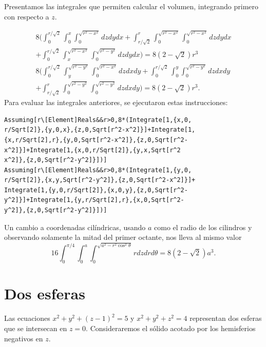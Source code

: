 Presentamos las integrales que permiten calcular el volumen, integrando primero con respecto a $z$.
%

{\small
\begin{multline*}
8\bigg( \int_{0}^{r/\sqrt{2}}\int_{0}^{x}\int_{0}^{\sqrt{r^{2}-x^{2}}}dzdydx+\int_{r/\sqrt{2}}^{r}\int_{0}^{\sqrt{r^{2}-x^{2}}}\int_{0}^{\sqrt{r^{2}-x^{2}}}dzdydx \\
+\int_{0}^{r/\sqrt{2}}\int_{x}^{\sqrt{r^{2}-x^{2}}}\int_{0}^{\sqrt{r^{2}-y^{2}}}dzdydx\bigg) = 8\left( 2-\sqrt{2}\right) r^{3} \\
8\bigg( \int_{0}^{r/\sqrt{2}}\int_{y}^{\sqrt{r^{2}-y^{2}}}\int_{0}^{\sqrt{r^{2}-x^{2}}}dzdxdy+\int_{0}^{r/\sqrt{2}}\int_{0}^{y}\int_{0}^{\sqrt{r^{2}-y^{2}}}dzdxdy \\
+\int_{r/\sqrt{2}}^{r}\int_{0}^{\sqrt{r^{2}-y^{2}}}\int_{0}^{\sqrt{r^{2}-y^{2}}}dzdxdy\bigg) = 8\left( 2-\sqrt{2}\right) r^{3}.
\end{multline*}
}
%
Para evaluar las integrales anteriores, se ejecutaron estas instrucciones:

\begin{tcolorbox}[title=\bf Instrucción en \verb"Mathematica"]\begin{Verbatim}[formatcom=\letraverbatim]
Assuming[r\[Element]Reals&&r>0,8*(Integrate[1,{x,0,
r/Sqrt[2]},{y,0,x},{z,0,Sqrt[r^2-x^2]}]+Integrate[1,
{x,r/Sqrt[2],r},{y,0,Sqrt[r^2-x^2]},{z,0,Sqrt[r^2-
x^2]}]+Integrate[1,{x,0,r/Sqrt[2]},{y,x,Sqrt[r^2
x^2]},{z,0,Sqrt[r^2-y^2]}])]
Assuming[r\[Element]Reals&&r>0,8*(Integrate[1,{y,0,
r/Sqrt[2]},{x,y,Sqrt[r^2-y^2]},{z,0,Sqrt[r^2-x^2]}]+
Integrate[1,{y,0,r/Sqrt[2]},{x,0,y},{z,0,Sqrt[r^2-
y^2]}]+Integrate[1,{y,r/Sqrt[2],r},{x,0,Sqrt[r^2-
y^2]},{z,0,Sqrt[r^2-y^2]}])]
\end{Verbatim}
\end{tcolorbox}

Un cambio a coordenadas cilíndricas, usando $a$ como el radio de los cilindros y observando solamente la mitad del primer octante, nos lleva al mismo valor
\[16\int_{0}^{\pi/4}\int_{0}^{a}\int_{0}^{\sqrt{a^{2}-r^{2}\cos^{2}\theta}}rdzdrd\theta=8(2-\sqrt{2})a^3.\]

\section{Dos esferas} 
Las ecuaciones $x^2+y^2+(z-1)^2=5$ y $x^2+y^2+z^2=4$
representan dos esferas que se intersecan en $z=0$. Consideraremos el sólido acotado por los hemisferios negativos en $z$.

